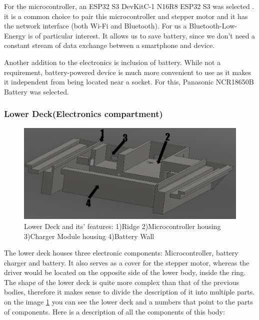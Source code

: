 For the microcontroller, an ESP32 S3 DevKitC-1 N16R8 ESP32 S3 was selected \cite{microcontroller}. it is a common choice to pair this microcontroller and stepper motor and it has the network interface (both Wi-Fi and Bluetooth). For us a Bluetooth-Low-Energy is of particular interest. It allows us to save battery, since we don't need a constant stream of data exchange between a smartphone and device.

Another addition to the electronics is inclusion of battery. While not a requirement, battery-powered device is much more convenient to use as it makes it independent from being located near a socket. For this, Panasonic NCR18650B \cite{panasonic_ncr18650b} Battery was selected. 
\newpage
\subsubsection{Lower Deck(Electronics compartment)}
\begin{figure}[h]
	\centering
	\includegraphics[width=0.7\linewidth]{Figures/Screenshot_13}
	\caption[Lower Deck]{Lower Deck and its' features: 1)Ridge 2)Microcontroller housing 3)Charger Module housing 4)Battery Wall}
	\label{fig:screenshot13}
\end{figure}
The lower deck houses three electronic components: Microcontroller, battery charger and battery. It also serves as a cover for the stepper motor, whereas the driver would be located on the opposite side of the lower body, inside the ring. The shape of the lower deck is quite more complex than that of the previous bodies, therefore it makes sense to divide the description of it into multiple parts. on the image \ref{fig:screenshot13} you can see the lower deck and a numbers that point to the parts of components. Here is a description of all the components of this body:
